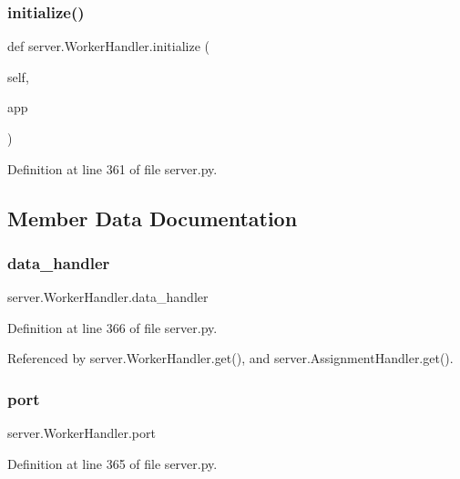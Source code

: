 \subsubsection{\texorpdfstring{initialize()}{initialize()}}
{\footnotesize\ttfamily def server.\+Worker\+Handler.\+initialize (\begin{DoxyParamCaption}\item[{}]{self,  }\item[{}]{app }\end{DoxyParamCaption})}



Definition at line 361 of file server.\+py.



\subsection{Member Data Documentation}
\mbox{\label{classserver_1_1WorkerHandler_a909f407723986b24288290f47350713b}} 
\subsubsection{\texorpdfstring{data\+\_\+handler}{data\_handler}}
{\footnotesize\ttfamily server.\+Worker\+Handler.\+data\+\_\+handler}



Definition at line 366 of file server.\+py.



Referenced by server.\+Worker\+Handler.\+get(), and server.\+Assignment\+Handler.\+get().

\mbox{\label{classserver_1_1WorkerHandler_a8e5f034200f695f81dfe03a1366ed391}} 
\subsubsection{\texorpdfstring{port}{port}}
{\footnotesize\ttfamily server.\+Worker\+Handler.\+port}



Definition at line 365 of file server.\+py.


